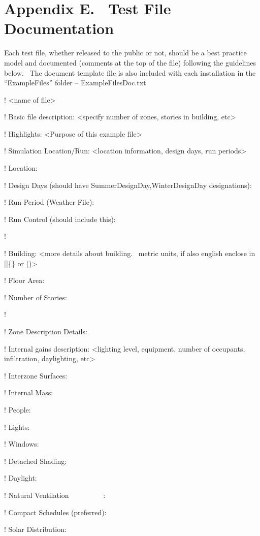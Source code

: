 \chapter{Appendix E.~ Test File Documentation}\label{appendix-e.-test-file-documentation}

Each test file, whether released to the public or not, should be a best practice model and documented (comments at the top of the file) following the guidelines below.~ The document template file is also included with each installation in the ``ExampleFiles'' folder -- ExampleFilesDoc.txt

! \textless{}name of file\textgreater{}

! Basic file description: \textless{}specify number of zones, stories in building, etc\textgreater{}

! Highlights: \textless{}Purpose of this example file\textgreater{}

! Simulation Location/Run: \textless{}location information, design days, run periods\textgreater{}

! Location:

! Design Days (should have SummerDesignDay,WinterDesignDay designations):

! Run Period (Weather File):

! Run Control (should include this):

!

! Building: \textless{}more details about building.~ metric units, if also english enclose in {[}{]}\{\} or ()\textgreater{}

! Floor Area:

! Number of Stories:

!

! Zone Description Details:

! Internal gains description: \textless{}lighting level, equipment, number of occupants, infiltration, daylighting, etc\textgreater{}

! Interzone Surfaces:

! Internal Mass:

! People:

! Lights:

! Windows:

! Detached Shading:

! Daylight:

! Natural Ventilation~~~~~~~~~ :

! Compact Schedules (preferred):

! Solar Distribution:

